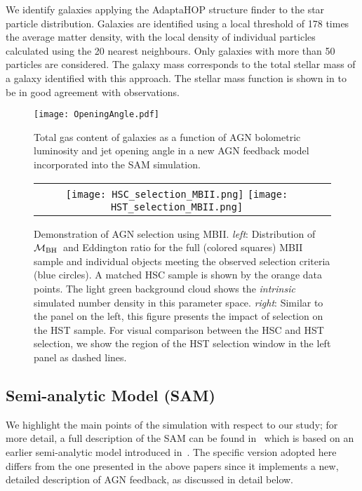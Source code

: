 \documentclass[twocolumn]{aastex631}
\def\mbh{$\mathcal M_{\rm BH}$}
\begin{document}
We identify galaxies applying the AdaptaHOP structure finder \citep{Aubert+04,Tweed+09} to the star particle distribution.  Galaxies are identified using a local threshold of 178 times the average matter density, with the local density of individual particles calculated using the 20 nearest neighbours. Only galaxies with more than 50 particles are considered. The galaxy mass corresponds to the total stellar mass of a galaxy identified with this approach. The stellar mass function is shown in \cite{2017MNRAS.467.4739K} to be in good agreement with observations.


\begin{figure}
\centering
\texttt{[image: OpeningAngle.pdf]}
\caption{\label{fig:SAM} 
Total gas content of galaxies as a function of AGN bolometric luminosity and jet opening angle in a new AGN feedback model incorporated into the SAM simulation.
}
\end{figure} 

\begin{figure*}
\centering
\begin{tabular}{c c}
{\texttt{[image: HSC\_selection\_MBII.png]}}
{\texttt{[image: HST\_selection\_MBII.png]}}
\end{tabular}
\caption{\label{fig:selection}Demonstration of AGN selection using MBII. {\it left}: Distribution of \mbh\ and Eddington ratio for the full (colored squares) MBII sample and individual objects meeting the observed selection criteria (blue circles). A matched HSC sample is shown by the orange data points. The light green background cloud shows the {\it intrinsic} simulated number density in this parameter space.
{\it right}: Similar to the panel on the left, this figure presents the impact of selection on the HST sample. For visual comparison between the HSC and HST selection, we show the region of the HST selection window in the left panel as dashed lines. 
}
\end{figure*}

\subsection{Semi-analytic Model (SAM)}\label{subsec:SAM}
We highlight the main points of the simulation with respect to our study; for more detail, a full description of the SAM can be found in~\citet{Menci2016} which is based on an earlier semi-analytic model introduced in~\citet{Menci2014}. The specific version adopted here differs from the one presented in the above papers since it implements a new, detailed description of AGN feedback, as discussed in detail below.
\end{document}

